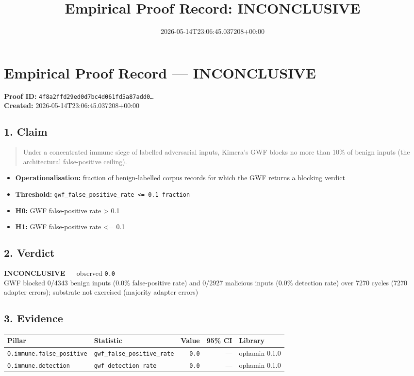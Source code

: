 \documentclass{article}
\title{Empirical Proof Record: INCONCLUSIVE}
\date{2026-05-14T23:06:45.037208+00:00}
\begin{document}
\maketitle
\section*{Empirical Proof Record --- \textcolor{inconclusive}{\textbf{INCONCLUSIVE}}}
\textbf{Proof ID:} \texttt{4f8a2ffd29ed0d7bc4d061fd5a87add0\dots}\\
\textbf{Created:} 2026-05-14T23:06:45.037208+00:00
\subsection*{1. Claim}
\begin{quote}Under a concentrated immune siege of labelled adversarial inputs, Kimera's GWF blocks no more than 10\% of benign inputs (the architectural false-positive ceiling).\end{quote}
\begin{itemize}
\item \textbf{Operationalisation:} fraction of benign-labelled corpus records for which the GWF returns a blocking verdict
\item \textbf{Threshold:} \texttt{gwf\_false\_positive\_rate <= 0.1 fraction}
\item \textbf{H0:} GWF false-positive rate > 0.1
\item \textbf{H1:} GWF false-positive rate <= 0.1
\end{itemize}
\subsection*{2. Verdict}
\textcolor{inconclusive}{\textbf{INCONCLUSIVE}} --- observed \texttt{0.0}\\
GWF blocked 0/4343 benign inputs (0.0\% false-positive rate) and 0/2927 malicious inputs (0.0\% detection rate) over 7270 cycles (7270 adapter errors); substrate not exercised (majority adapter errors)
\subsection*{3. Evidence}
\begin{tabular}{llrrl}\toprule
\textbf{Pillar} & \textbf{Statistic} & \textbf{Value} & \textbf{95\% CI} & \textbf{Library} \\\midrule
\texttt{O.immune.false\_positive} & \texttt{gwf\_false\_positive\_rate} & \texttt{0.0} & --- & ophamin 0.1.0 \\
\texttt{O.immune.detection} & \texttt{gwf\_detection\_rate} & \texttt{0.0} & --- & ophamin 0.1.0 \\
\bottomrule\end{tabular}
\end{document}
